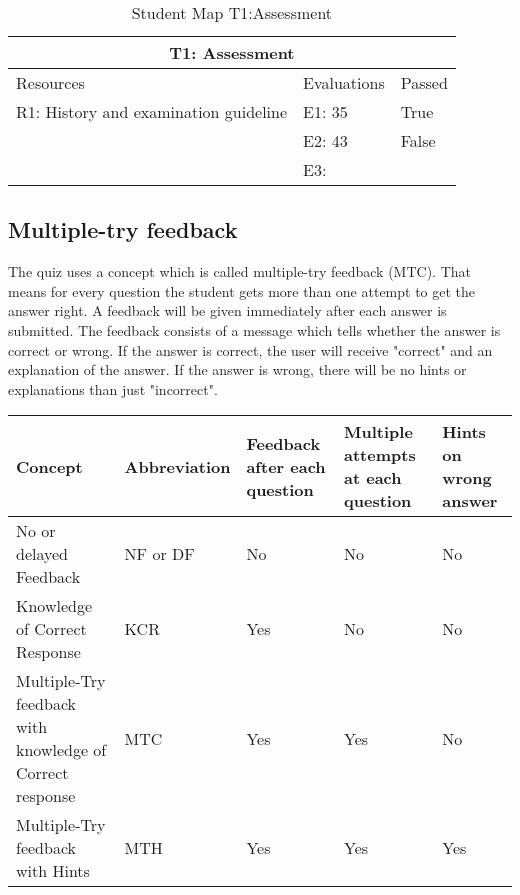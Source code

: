 \begin{table}[h!]
	\caption{Student Map T1:Assessment}
	\label{table:StudentMap}
	\begin{tabular}{ | m{16em} | m{10em}| m{6em} | } 
		\hline
		\multicolumn{3}{c}{\bfseries T1: Assessment} \\
		\hline
		Resources & Evaluations & Passed \\
		\hline
		R1: History and examination guideline & E1: 35 & True \\
		& E2: 43 & False \\
		& E3: &  \\
		\hline
	\end{tabular}
\end{table}


\subsection{Multiple-try feedback}
The quiz uses a concept which is called multiple-try feedback (MTC). That means for every question the student gets more than one attempt to get the answer right. A feedback will be given immediately after each answer is submitted. The feedback consists of a message which tells whether the answer is correct or wrong. If the answer is correct, the user will receive "correct" and an explanation of the answer. If the answer is wrong, there will be no hints or explanations than just "incorrect".

\begin{tabular}{ | m{10em} | m{6em}| m{6em} | m{6em} | m{5em} | } 
	\hline
	Concept & Abbreviation & Feedback after each question & Multiple attempts at each question & Hints on wrong answer \\ [0.5ex]
	\hline
No or delayed Feedback & NF or DF & No & No & No  \\
Knowledge of Correct Response & KCR  & Yes & No & No \\
Multiple-Try feedback with knowledge of Correct response  & MTC & Yes & Yes & No \\
Multiple-Try feedback with Hints & MTH & Yes & Yes & Yes \\
\hline
\end{tabular}

